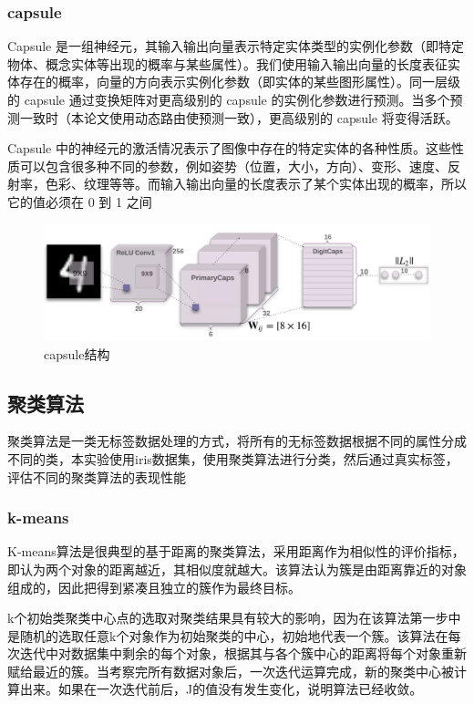 \documentclass{article}
\begin{document}
	\subsubsection{capsule}
	Capsule 是一组神经元，其输入输出向量表示特定实体类型的实例化参数（即特定物体、概念实体等出现的概率与某些属性）。我们使用输入输出向量的长度表征实体存在的概率，向量的方向表示实例化参数（即实体的某些图形属性）。同一层级的 capsule 通过变换矩阵对更高级别的 capsule 的实例化参数进行预测。当多个预测一致时（本论文使用动态路由使预测一致），更高级别的 capsule 将变得活跃。
	
	Capsule 中的神经元的激活情况表示了图像中存在的特定实体的各种性质。这些性质可以包含很多种不同的参数，例如姿势（位置，大小，方向）、变形、速度、反射率，色彩、纹理等等。而输入输出向量的长度表示了某个实体出现的概率，所以它的值必须在 0 到 1 之间
	
	\begin{figure}[htb]
	\centering\includegraphics[scale=0.3]{capsule}
	\caption{capsule结构}\label{fig:3}
	\end{figure}
	\subsection{聚类算法}
	聚类算法是一类无标签数据处理的方式，将所有的无标签数据根据不同的属性分成不同的类，本实验使用iris数据集，使用聚类算法进行分类，然后通过真实标签，评估不同的聚类算法的表现性能
	\subsubsection{k-means}
	K-means算法是很典型的基于距离的聚类算法，采用距离作为相似性的评价指标，即认为两个对象的距离越近，其相似度就越大。该算法认为簇是由距离靠近的对象组成的，因此把得到紧凑且独立的簇作为最终目标。
	
	k个初始类聚类中心点的选取对聚类结果具有较大的影响，因为在该算法第一步中是随机的选取任意k个对象作为初始聚类的中心，初始地代表一个簇。该算法在每次迭代中对数据集中剩余的每个对象，根据其与各个簇中心的距离将每个对象重新赋给最近的簇。当考察完所有数据对象后，一次迭代运算完成，新的聚类中心被计算出来。如果在一次迭代前后，J的值没有发生变化，说明算法已经收敛。
\end{document}
